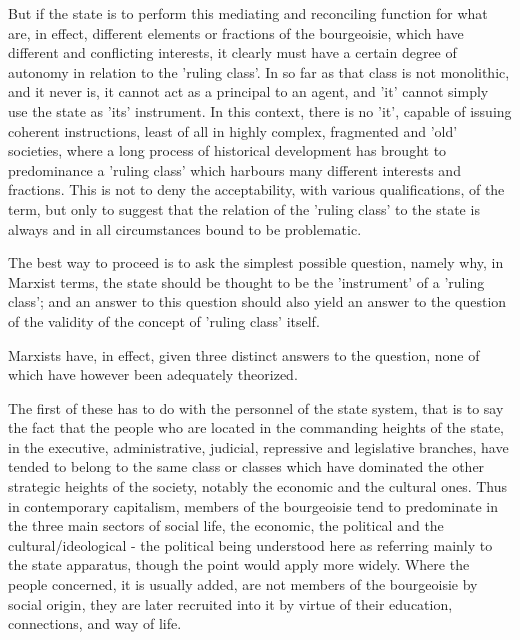 But if the state is to perform this mediating and reconciling function for what are, in effect, different elements or fractions of the bourgeoisie, which have different and conflicting interests, it clearly must have a certain degree of autonomy in relation to the 'ruling class'. In so far as that class is not monolithic, and it never is, it cannot act as a principal to an agent, and 'it' cannot simply use the state as 'its' instrument. In this context, there is no 'it', capable of issuing coherent instructions, least of all in highly complex, fragmented and 'old' societies, where a long process of historical development has brought to predominance a 'ruling class' which harbours many different interests and fractions. This is not to deny the acceptability, with various qualifications, of the term, but only to suggest that the relation of the 'ruling class' to the state is always and in all circumstances bound to be problematic.

The best way to proceed is to ask the simplest possible question, namely why, in Marxist terms, the state should be thought to be the 'instrument' of a 'ruling class'; and an answer to this question should also yield an answer to the question of the validity of the concept of 'ruling class' itself.

Marxists have, in effect, given three distinct answers to the question, none of which have however been adequately theorized.

The first of these has to do with the personnel of the state system, that is to say the fact that the people who are located in the commanding heights of the state, in the executive, administrative, judicial, repressive and legislative branches, have tended to belong to the same class or classes which have dominated the other strategic heights of the society, notably the economic and the cultural ones. Thus in contemporary capitalism, members of the bourgeoisie tend to predominate in the three main sectors of social life, the economic, the political  and the cultural/ideological - the political being understood here as referring mainly to the state apparatus, though the point would apply more widely. Where the people concerned, it is usually added, are not members of the bourgeoisie by social origin, they are later recruited into it by virtue of their education, connections, and way of life.


